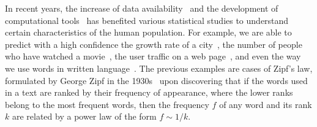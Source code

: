 \documentclass[10pt,letterpaper]{article} %
\begin{document}


	
In recent years, the increase of data availability~\cite{Hilbert60} and the development of computational tools~\cite{doi:10.1098/rsta.2019.0061} has
benefited various statistical studies to understand certain characteristics of
the human population. For example, we are able to predict with a high confidence the growth rate of a
city~\cite{Batty:2012Cities,Murcio2015}, the number of people who have watched a movie~\cite{sinha2005blockbusters}, the user traffic on a web
page~\cite{BARABASI200069}, and even the way we use words in written language~\cite{Montemurro2001567,ZipfRnd2002}. The previous examples
are cases of  Zipf's law, formulated by George Zipf in the 1930s~\cite{Zipf,Petruszewycz1973Lhistoire-de-la,newman2005power,1367-2630-13-4-043004,Perc07122012,1367-2630-15-9-093033} upon
discovering that if  the words used in a text are ranked by their frequency of
appearance, where the lower ranks belong to the most frequent words,  then the
frequency  $f$  of any word and its rank  $k$ are related by a power law of the
form $f\sim1/k$.




\end{document}
